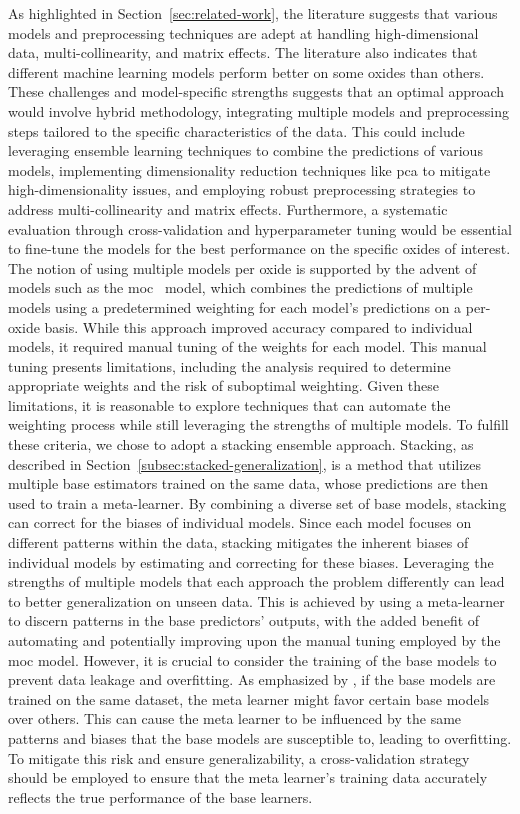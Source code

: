 As highlighted in Section~\ref{sec:related-work}, the literature suggests that various models and preprocessing techniques are adept at handling high-dimensional data, multi-collinearity, and matrix effects.
The literature also indicates that different machine learning models perform better on some oxides than others.
These challenges and model-specific strengths suggests that an optimal approach would involve hybrid methodology, integrating multiple models and preprocessing steps tailored to the specific characteristics of the data.
This could include leveraging ensemble learning techniques to combine the predictions of various models, implementing dimensionality reduction techniques like \gls{pca} to mitigate high-dimensionality issues, and employing robust preprocessing strategies to address multi-collinearity and matrix effects.
Furthermore, a systematic evaluation through cross-validation and hyperparameter tuning would be essential to fine-tune the models for the best performance on the specific oxides of interest.
The notion of using multiple models per oxide is supported by the advent of models such as the \gls{moc}~\cite{cleggRecalibrationMarsScience2017} model, which combines the predictions of multiple models using a predetermined weighting for each model's predictions on a per-oxide basis.
While this approach improved accuracy compared to individual models, it required manual tuning of the weights for each model.
This manual tuning presents limitations, including the analysis required to determine appropriate weights and the risk of suboptimal weighting.
Given these limitations, it is reasonable to explore techniques that can automate the weighting process while still leveraging the strengths of multiple models.
To fulfill these criteria, we chose to adopt a stacking ensemble approach. 
Stacking, as described in Section~\ref{subsec:stacked-generalization}, is a method that utilizes multiple base estimators trained on the same data, whose predictions are then used to train a meta-learner.
By combining a diverse set of base models, stacking can correct for the biases of individual models.
Since each model focuses on different patterns within the data, stacking mitigates the inherent biases of individual models by estimating and correcting for these biases.
Leveraging the strengths of multiple models that each approach the problem differently can lead to better generalization on unseen data.
This is achieved by using a meta-learner to discern patterns in the base predictors' outputs\cite{wolpertstacked_1992, survey_of_ensemble_learning}, with the added benefit of automating and potentially improving upon the manual tuning employed by the \gls{moc} model.
However, it is crucial to consider the training of the base models to prevent data leakage and overfitting.
As emphasized by \citet{cvstacking}, if the base models are trained on the same dataset, the meta learner might favor certain base models over others.
This can cause the meta learner to be influenced by the same patterns and biases that the base models are susceptible to, leading to overfitting.
To mitigate this risk and ensure generalizability, a cross-validation strategy should be employed to ensure that the meta learner's training data accurately reflects the true performance of the base learners.

